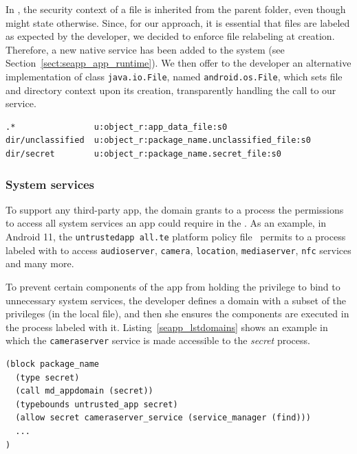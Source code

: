 In \sel, the security context of a file is inherited from the parent
folder, even though \filecontexts might state otherwise.  Since, for
our approach, it is essential that files are labeled as expected by
the developer, we decided to enforce file relabeling at creation.
Therefore, a new native service has been added to the system (see
Section~\ref{sect:seapp_app_runtime}).  We then offer to the developer an
alternative implementation of class \texttt{java.io.File}, named
\texttt{android.os.File}, which sets file and directory context upon
its creation, transparently handling the call to our service.

\begin{lstlisting}[language=policyfile, caption=\filecontexts
  example, label=seapp_lstfile, numbersep=2pt,resetmargins=false]
.*                u:object_r:app_data_file:s0
dir/unclassified  u:object_r:package_name.unclassified_file:s0
dir/secret        u:object_r:package_name.secret_file:s0
\end{lstlisting}


\subsubsection{System services}\label{subsub:seapp_service_control}

To support any third-party app, the \untrustedapp domain grants to a
process the permissions to access all system services an app could
require in the \manifest.  As an example, in Android 11, the
\texttt{untrusted\textunderscore app\textunderscore
  all.te} platform policy file~\cite{seapp_untrustedappte} permits to
a process labeled with \untrustedapp to access \texttt{audioserver}, \texttt{camera},
\texttt{location}, \texttt{mediaserver}, \texttt{nfc} services and
many more.

To prevent certain components of the app from holding the privilege to
bind to unnecessary system services, the developer defines a domain
with a subset of the \untrustedapp privileges (in the local \sepolicy
file), and then she ensures the components are executed in the process
labeled with it.  Listing~\ref{seapp_lstdomains} shows an example in
which the {\tt cameraserver} service is made accessible to the {\em
  secret} process.

\begin{lstlisting}[language=policyfile, caption=Granting \texttt{cameraserver}
access to secret domain, label=seapp_lstdomains, numbersep=2pt,resetmargins=false]
(block package_name
  (type secret)
  (call md_appdomain (secret))
  (typebounds untrusted_app secret)
  (allow secret cameraserver_service (service_manager (find)))
  ...
)
\end{lstlisting}

